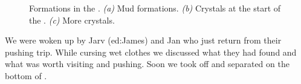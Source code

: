 \begin{figure}[t!]
\begin{subfigure}[t]{0.418\textwidth}
        \caption{} \label{crystal formation}
    \end{subfigure}

    \caption{Formations in the \protect{}.
    \textit{(a)} Mud formations. 
    \textit{(b)} Crystals at the start of the \protect{}. 
    \textit{(c)} More crystals. }
\end{figure}



We were woken up by Jarv (ed:James) and Jan who just return from their pushing trip. While cursing wet clothes we discussed what they had found and what was worth visiting and pushing. Soon we took off and separated on the bottom of .



